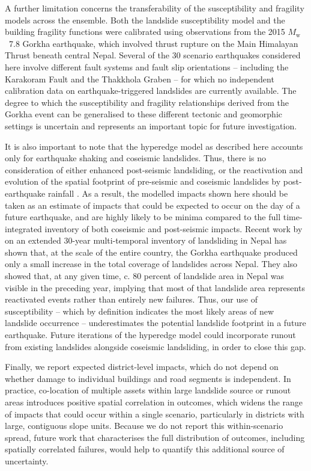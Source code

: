 \documentclass[nhess, manuscript]{copernicus}
\begin{document}
A further limitation concerns the transferability of the susceptibility and fragility models across the ensemble. Both the landslide susceptibility model and the building fragility functions were calibrated using observations from the 2015 $M_{\mathrm{w}}$~7.8 Gorkha earthquake, which involved thrust rupture on the Main Himalayan Thrust beneath central Nepal. Several of the 30 scenario earthquakes considered here involve different fault systems and fault slip orientations -- including the Karakoram Fault and the Thakkhola Graben -- for which no independent calibration data on earthquake-triggered landslides are currently available. The degree to which the susceptibility and fragility relationships derived from the Gorkha event can be generalised to these different tectonic and geomorphic settings is uncertain and represents an important topic for future investigation.

It is also important to note that the hyperedge model as described here accounts only for earthquake shaking and coseismic landslides. Thus, there is no consideration of either enhanced post-seismic landsliding, or the reactivation and evolution of the spatial footprint of pre-seismic and coseismic landslides by post-earthquake rainfall \citep{Kincey2021,Kincey2023,Shrestha2026}. As a result, the modelled impacts shown here should be taken as an estimate of impacts that could be expected to occur on the day of a future earthquake, and are highly likely to be minima compared to the full time-integrated inventory of both coseismic and post-seismic impacts. Recent work by \citet{Harvey2026} on an extended 30-year multi-temporal inventory of landsliding in Nepal has shown that, at the scale of the entire country, the Gorkha earthquake produced only a small increase in the total coverage of landslides across Nepal. They also showed that, at any given time, c. 80 percent of landslide area in Nepal was visible in the preceding year, implying that most of that landslide area represents reactivated events rather than entirely new failures. Thus, our use of susceptibility -- which by definition indicates the most likely areas of new landslide occurrence -- underestimates the potential landslide footprint in a future earthquake. Future iterations of the hyperedge model could incorporate runout from existing landslides \citep[e.g.,][]{Kincey2023} alongside coseismic landsliding, in order to close this gap.

Finally, we report expected district-level impacts, which do not depend on whether damage to individual buildings and road segments is independent. In practice, co-location of multiple assets within large landslide source or runout areas introduces positive spatial correlation in outcomes, which widens the range of impacts that could occur within a single scenario, particularly in districts with large, contiguous slope units. Because we do not report this within-scenario spread, future work that characterises the full distribution of outcomes, including spatially correlated failures, would help to quantify this additional source of uncertainty.
\end{document}
